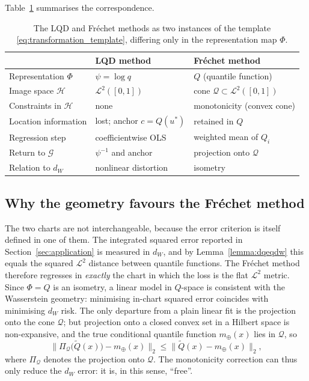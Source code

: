 \begin{postsub}
Table~\ref{tab:method_comparison} summarises the correspondence.

\begin{table}[h!]
    \centering
    \begin{tabular}{lll}
        \toprule
                                     & LQD method              & Fréchet method \\
        \midrule
        Representation $\Phi$        & $\psi = \log q$         & $Q$ (quantile function) \\
        Image space $\mathcal{H}$    & $\mathcal{L}^2([0,1])$  & cone $\mathcal{Q}\subset\mathcal{L}^2([0,1])$ \\
        Constraints in $\mathcal{H}$ & none                    & monotonicity (convex cone) \\
        Location information         & lost; anchor $c=Q(u^*)$ & retained in $Q$ \\
        Regression step              & coefficientwise OLS     & weighted mean of $Q_i$ \\
        Return to $\mathcal{G}$      & $\psi^{-1}$ and anchor  & projection onto $\mathcal{Q}$ \\
        Relation to $d_W$            & nonlinear distortion    & isometry \\
        \bottomrule
    \end{tabular}
    \caption[Comparison of the two transformation maps]{The LQD and Fréchet methods as two
    instances of the template \eqref{eq:transformation_template}, differing only in the
    representation map $\Phi$.}
    \label{tab:method_comparison}
\end{table}

\subsection{Why the geometry favours the Fréchet method}
\label{sec:geometry_argument}
The two charts are not interchangeable, because the error criterion is itself defined in
one of them. The integrated squared error reported in Section~\ref{sec:application} is
measured in $d_W$, and by Lemma~\ref{lemma:dqeqdw} this equals the squared $\mathcal{L}^2$
distance between quantile functions. The Fréchet method therefore regresses in
\emph{exactly} the chart in which the loss is the flat $\mathcal{L}^2$ metric. Since
$\Phi = Q$ is an isometry, a linear model in $Q$-space is consistent with the Wasserstein
geometry: minimising in-chart squared error coincides with minimising $d_W$ risk. The only
departure from a plain linear fit is the projection onto the cone $\mathcal{Q}$; but
projection onto a closed convex set in a Hilbert space is non-expansive, and the true
conditional quantile function $m_\oplus(x)$ lies in $\mathcal{Q}$, so
\begin{equation}
    \label{eq:nonexpansive}
    \big\| \Pi_{\mathcal{Q}}\bigl(\tilde{Q}(x)\bigr) - m_\oplus(x) \big\|_2
    \le \big\| \tilde{Q}(x) - m_\oplus(x) \big\|_2,
\end{equation}
where $\Pi_{\mathcal{Q}}$ denotes the projection onto $\mathcal{Q}$. The monotonicity
correction can thus only reduce the $d_W$ error: it is, in this sense, ``free''.


\end{postsub}
